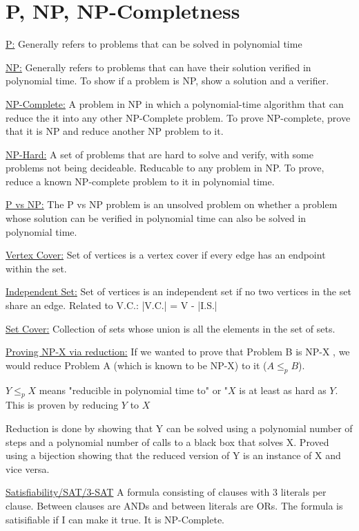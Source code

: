 \documentclass{article}
\begin{document}
\section{P, NP, NP-Completness}

\underline{P:} Generally refers to problems that can be solved in polynomial time

\underline{NP:} Generally refers to problems that can have their solution verified in polynomial time. To show if a problem is NP, show a solution and a verifier.

\underline{NP-Complete:} A problem in NP in which a polynomial-time algorithm that can reduce
the it into any other NP-Complete problem. To prove NP-complete, prove that it is NP and reduce another NP problem to it.

\underline{NP-Hard:} A set of problems that are hard to solve and verify, with some problems not being decideable. Reducable to any problem in NP. To prove, reduce a known NP-complete problem to it in polynomial time.

\underline{P vs NP:} The P vs NP problem is an unsolved problem on whether a problem whose solution can be
verified in polynomial time can also be solved in polynomial time. 

\underline{Vertex Cover:} Set of vertices is a vertex cover if every edge has an endpoint within the
set.

\underline{Independent Set:} Set of vertices is an independent set if no two vertices in the set
share an edge. Related to V.C.: |V.C.| = V - |I.S.|

\underline{Set Cover:} Collection of sets whose union is all the elements in the set of sets.


\underline{Proving NP-X via reduction:} If we wanted to prove that Problem B is NP-X
, we would reduce Problem A (which is known to be NP-X) to it ($A \leq_p B$). 

$Y \le_p X$ means "reducible in polynomial time to" or "$X$ is at least as hard as $Y$. This is proven by reducing $Y$ to $X$

Reduction is done by showing that Y can be solved using a polynomial number of steps and a
polynomial number of calls to a black box that solves X. Proved using a bijection showing that the
reduced version of Y is an instance of X and vice versa.

\underline{Satisfiability/SAT/3-SAT} A formula consisting of clauses with 3 literals per clause.
Between clauses are ANDs and between literals are ORs. The formula is satisifiable if I can make it
true. It is NP-Complete.
\end{document}
